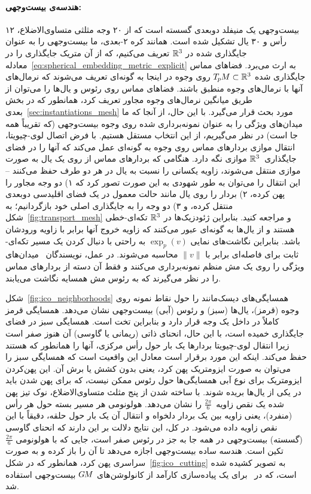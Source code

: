 \paragraph{هندسه‌ی بیست‌وجهی:}
بیست‌وجهی یک منیفلد دوبعدی گسسته است که از ۲۰ وجه مثلثی متساوی‌الاضلاع، ۱۲ رأس و ۳۰ یال تشکیل شده است.
همانند کره ۲-بعدی، ما بیست‌وجهی را به عنوان جایگذاری شده در $\mathbb{R}^3$ تعریف می‌کنیم، که از آن متریک جایگذاری را در معادله~\eqref{eq:spherical_embedding_metric_explicit} به ارث می‌برد.
فضاهای مماس جایگذاری شده $T_{\mkern-1.5mu p}\mkern-.5muM \subset \mathbb{R}^3$ روی وجوه در اینجا به گونه‌ای تعریف می‌شوند که نرمال‌های آنها با نرمال‌های وجوه منطبق باشند.
فضاهای مماس روی رئوس و یال‌ها را می‌توان از طریق میانگین نرمال‌های وجوه مجاور تعریف کرد، همانطور که در بخش بعدی~\ref{sec:instantiations_mesh} مورد بحث قرار می‌گیرد.
با این حال، از آنجا که ما میدان‌های ویژگی را به عنوان نمونه‌برداری شده روی وجوه بیست‌وجهی (که تقریباً همه جا است) در نظر می‌گیریم، از این انتخاب مستقل هستیم.
با فرض اتصال لوی-چیویتا، انتقال موازی بردارهای مماس روی وجوه به گونه‌ای عمل می‌کند که آنها را در فضای جایگذاری~$\mathbb{R}^3$ موازی نگه دارد.
هنگامی که بردارهای مماس از روی یک یال به صورت موازی منتقل می‌شوند، زاویه یکسانی را نسبت به یال در هر دو طرف حفظ می‌کنند -- این انتقال را می‌توان به طور شهودی به این صورت تصور کرد که ۱) دو وجه مجاور را پهن کرده، ۲) بردار را روی یال مانند حالت معمول در یک فضای اقلیدسی دوبعدی منتقل کرده، و ۳) دو وجه را به جایگذاری اصلی خود بازگردانیم؛ به شکل~\ref{fig:transport_mesh} و \cite{craneDiscreteDifferentialGeometry2014} مراجعه کنید.
بنابراین ژئودزیک‌ها در $\mathbb{R}^3$ تکه‌ای-خطی هستند و از یال‌ها به گونه‌ای عبور می‌کنند که زاویه خروج آنها برابر با زاویه ورودشان باشد.
بنابراین نگاشت‌های نمایی $\exp_p(v)$ به راحتی با دنبال کردن یک مسیر تکه‌ای-ثابت برای فاصله‌ای برابر با $\lVert v\rVert$ محاسبه می‌شوند.
در عمل، نویسندگان~\cite{liu2018icoAltAz,gaugeIco2019,zhang2019orientation} میدان‌های ویژگی را روی یک مش منظم نمونه‌برداری می‌کنند و فقط آن دسته از بردارهای مماس را در نظر می‌گیرند که به رئوس مش همسایه نگاشت می‌یابند.


شکل~\ref{fig:ico_neighborhoods} همسایگی‌های دیسک‌مانند را حول نقاط نمونه روی وجوه (قرمز)، یال‌ها (سبز) و رئوس (آبی) بیست‌وجهی نشان می‌دهد.
همسایگی قرمز کاملاً در داخل یک وجه قرار دارد و بنابراین تخت است.
همسایگی سبز در فضای جایگذاری خمیده است، با این حال، انحنای ذاتی (ریمانی یا گاوسی) آن هنوز صفر است زیرا انتقال لوی-چیویتا بردارها یک بار حول رأس مرکزی، آنها را همانطور که هستند حفظ می‌کند.
اینکه این مورد برقرار است معادل این واقعیت است که همسایگی سبز را می‌توان به صورت ایزومتریک پهن کرد، یعنی بدون کشش یا برش آن.
این پهن‌کردن ایزومتریک برای نوع آبی همسایگی‌ها حول رئوس ممکن نیست، که برای پهن شدن باید در یکی از یال‌ها بریده شوند.
با ساخته شدن از پنج مثلث متساوی‌الاضلاع، نوک تیز پهن شده یک نقص زاویه~$\frac{2\pi}{6}$ را نشان می‌دهد.
هولونومی هر مسیر بسته حول هر رأس (منفرد)، یعنی زاویه بین یک بردار دلخواه و انتقال آن یک بار حول حلقه، دقیقاً با این نقص زاویه داده می‌شود.
در کل، این نتایج دلالت بر این دارند که انحنای گاوسی (گسسته) بیست‌وجهی در همه جا به جز در رئوس صفر است، جایی که با هولونومی $\frac{2\pi}{6}$ تکین است.
هندسه ساده بیست‌وجهی اجازه می‌دهد تا آن را باز کرده و به صورت سراسری پهن کرد، همانطور که در شکل~\ref{fig:ico_cutting} به تصویر کشیده شده است، که در~\cite{liu2018icoAltAz,gaugeIco2019,zhang2019orientation} برای یک پیاده‌سازی کارآمد از کانولوشن‌های $G\mkern-1.4muM$ بیست‌وجهی استفاده شد.


